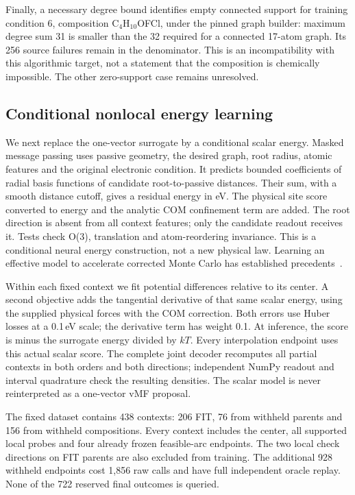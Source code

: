 Finally, a necessary degree bound identifies empty connected support for
training condition 6, composition C$_4$H$_{10}$OFCl, under the pinned graph
builder: maximum degree sum 31 is smaller than the 32 required for a connected
17-atom graph. Its 256 source failures remain in the denominator. This is an
incompatibility with this algorithmic target, not a statement that the composition
is chemically impossible. The other zero-support case remains unresolved.

\subsection{Conditional nonlocal energy learning}
\label{app:nonlocal-arc-learning}

We next replace the one-vector surrogate by a conditional scalar energy. Masked
message passing uses passive geometry, the desired graph, root radius, atomic
features and the original electronic condition. It predicts bounded coefficients
of radial basis functions of candidate root-to-passive distances. Their sum,
with a smooth distance cutoff, gives a residual energy in eV. The physical site
score converted to energy and the analytic COM confinement term are added.
The root direction is absent from all context features; only the candidate
readout receives it. Tests check O(3), translation and atom-reordering invariance.
This is a conditional neural energy construction, not a new physical law.
Learning an effective model to accelerate corrected Monte Carlo has established
precedents~\citep{liu2017slmc,shen2018slmc}.

Within each fixed context we fit potential differences relative to its center.
A second objective adds the tangential derivative of that same scalar energy,
using the supplied physical forces with the COM correction. Both errors use
Huber losses at a 0.1\,eV scale; the derivative term has weight 0.1. At inference,
the score is minus the surrogate energy divided by $kT$. Every interpolation
endpoint uses this actual scalar score. The complete joint decoder recomputes
all partial contexts in both orders and both directions; independent NumPy
readout and interval quadrature check the resulting densities. The scalar model
is never reinterpreted as a one-vector vMF proposal.

The fixed dataset contains 438 contexts: 206 FIT, 76 from withheld parents and
156 from withheld compositions. Every context includes the center, all supported
local probes and four already frozen feasible-arc endpoints. The two local
check directions on FIT parents are also excluded from training. The additional
928 withheld endpoints cost 1,856 raw calls and have full independent oracle
replay. None of the 722 reserved final outcomes is queried.

